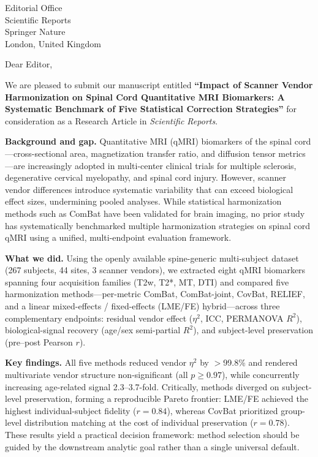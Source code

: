 \documentclass[11pt,a4paper]{letter}
\begin{document}
\begin{letter}{Editorial Office\\
Scientific Reports\\
Springer Nature\\
London, United Kingdom}

\opening{Dear Editor,}

We are pleased to submit our manuscript entitled \textbf{``Impact of Scanner Vendor Harmonization on Spinal Cord Quantitative MRI Biomarkers: A Systematic Benchmark of Five Statistical Correction Strategies''} for consideration as a Research Article in \textit{Scientific Reports}.

\textbf{Background and gap.} Quantitative MRI (qMRI) biomarkers of the spinal cord---cross-sectional area, magnetization transfer ratio, and diffusion tensor metrics---are increasingly adopted in multi-center clinical trials for multiple sclerosis, degenerative cervical myelopathy, and spinal cord injury. However, scanner vendor differences introduce systematic variability that can exceed biological effect sizes, undermining pooled analyses. While statistical harmonization methods such as ComBat have been validated for brain imaging, no prior study has systematically benchmarked multiple harmonization strategies on spinal cord qMRI using a unified, multi-endpoint evaluation framework.

\textbf{What we did.} Using the openly available spine-generic multi-subject dataset (267 subjects, 44 sites, 3 scanner vendors), we extracted eight qMRI biomarkers spanning four acquisition families (T2w, T2*, MT, DTI) and compared five harmonization methods---per-metric ComBat, ComBat-joint, CovBat, RELIEF, and a linear mixed-effects / fixed-effects (LME/FE) hybrid---across three complementary endpoints: residual vendor effect ($\eta^2$, ICC, PERMANOVA $R^2$), biological-signal recovery (age/sex semi-partial $R^2$), and subject-level preservation (pre--post Pearson $r$).

\textbf{Key findings.} All five methods reduced vendor $\eta^2$ by $>$99.8\% and rendered multivariate vendor structure non-significant (all $p \geq 0.97$), while concurrently increasing age-related signal 2.3--3.7-fold. Critically, methods diverged on subject-level preservation, forming a reproducible Pareto frontier: LME/FE achieved the highest individual-subject fidelity ($r = 0.84$), whereas CovBat prioritized group-level distribution matching at the cost of individual preservation ($r = 0.78$). These results yield a practical decision framework: method selection should be guided by the downstream analytic goal rather than a single universal default.


\end{letter}
\end{document}
